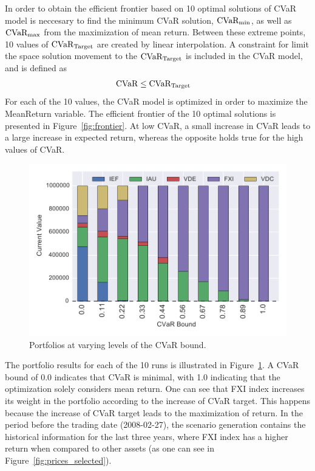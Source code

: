 In order to obtain the efficient frontier based on 10 optimal solutions of CVaR model is neccesary to find the minimum CVaR solution, $\textup{CVaR}_{\min}$, as well as $\textup{CVaR}_{\max}$ from the maximization of mean return.
Between these extreme points, 10 values of $\textup{CVaR}_{\textup{Target}}$ are created by linear interpolation. 
A constraint for limit the space solution movement to the $\textup{CVaR}_{\textup{Target}}$ is included in the CVaR model, and is defined as
\begin{align}
\textup{CVaR} &\le \textup{CVaR}_{\textup{Target}} 
\end{align}
For each of the 10 values, the CVaR model is optimized in order to maximize the MeanReturn variable. 
The efficient frontier of the 10 optimal solutions is presented in Figure~\ref{fig:frontier}.
At low CVaR, a small increase in CVaR leads to a large increase in expected return, whereas the opposite holds true for the high values of CVaR.


\begin{figure}[tp]
\centering
\includegraphics{../pic/Stake_vs_CVaR.pdf}
\caption{Portfolios at varying levels of the CVaR bound.}
\label{fig:scenarioportfolios}
\end{figure}

The portfolio results for each of the 10 runs is illustrated in Figure~\ref{fig:scenarioportfolios}.
A CVaR bound of 0.0 indicates that CVaR is minimal, with 1.0 indicating that the optimization solely considers mean return.
One can see that FXI index increases its weight in the portfolio according to the increase of CVaR target. 
This happens because the increase of CVaR target leads to the maximization of return.
In the period before the trading date (2008-02-27), the scenario generation contains the historical information for the last three years, where FXI index has a higher return when compared to other assets (as one can see in Figure~\ref{fig:prices_selected}).

